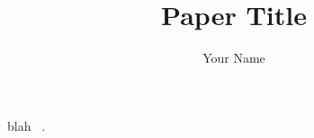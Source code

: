 \documentclass{article}
\title{Paper Title}
\author{Your Name}
\begin{document}
    \maketitle

     

     


    blah ~\cite{Jo09, PaperII}.

     

     
    
    

     

    
\end{document}
